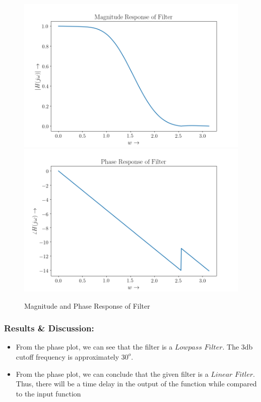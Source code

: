 \documentclass[11pt, a4paper]{article}
\begin{document}
\newpage
\begin{figure}[!tbh]
  \centering
  \includegraphics[scale=0.6]{./../Extras/a10-1.png}  %
  \includegraphics[scale=0.6]{./../Extras/a10-2.png}  %
  \caption{Magnitude and Phase Response of Filter}
\end{figure}
\newpage
\subsubsection{Results \& Discussion:}\label{results-discussion}
\begin{itemize}
  \item From the phase plot, we can see that the filter is a $Lowpass$ $Filter$. The 3db cutoff frequency is approximately $30^{o}$.
  \item From the phase plot, we can conclude that the given filter is a $Linear$ $Fitler$. Thus, there will be a time delay in the output of the function while compared to the input function
\end{itemize}
\newpage
\end{document}
